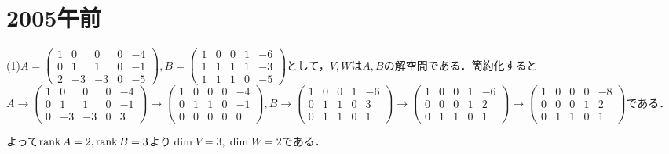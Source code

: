 \documentclass[
		book,
		head_space=20mm,
		foot_space=20mm,
		gutter=10mm,
		line_length=190mm
]{jlreq}
\begin{document}
\section{2005午前}
(1)$A=\begin{pmatrix}
1&0&0&0&-4\\
0&1&1&0&-1\\
2&-3&-3&0&-5
\end{pmatrix},B=\begin{pmatrix}
1&0&0&1&-6\\
1&1&1&1&-3\\
1&1&1&0&-5
\end{pmatrix}$として，$V,W$は$A,B$の解空間である．簡約化すると
$A\to\begin{pmatrix}
1&0&0&0&-4\\
0&1&1&0&-1\\
0&-3&-3&0&3
\end{pmatrix}\to\begin{pmatrix}
1&0&0&0&-4\\
0&1&1&0&-1\\
0&0&0&0&0
\end{pmatrix},B\to\begin{pmatrix}
1&0&0&1&-6\\
0&1&1&0&3\\
0&1&1&0&1
\end{pmatrix}\to\begin{pmatrix}
1&0&0&1&-6\\
0&0&0&1&2\\
0&1&1&0&1
\end{pmatrix}\to\begin{pmatrix}
1&0&0&0&-8\\
0&0&0&1&2\\
0&1&1&0&1
\end{pmatrix}$である．

よって$\rank A=2,\rank B=3$より$\dim V=3,\dim W=2$である．
\end{document}
